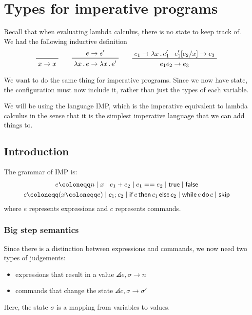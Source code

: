 \documentclass[class=scrartcl]{standalone}
\begin{document}
\chapter{Types for imperative programs}
Recall that when evaluating lambda calculus,
there is no state to keep track of.
We had the following inductive definition
\[
  \prfaxiom{x \to x} \qquad
  \prftree{e \to e'}
          {\plambda{x}{e} \to \plambda{x}{e'}} \qquad
  \prftree{e_1 \to \plambda{x}{e_1'}}
          {e_1'[e_2/x] \to e_3}
          {e_1 e_2 \to e_3}
\]

We want to do the same thing for imperative programs.
Since we now have state, the configuration must now include it,
rather than just the types of each variable.

We will be using the language IMP,
which is the imperative equivalent to lambda calculus
in the sense that it is the simplest imperative language
that we can add things to.

\section{Introduction}
The grammar of IMP is:
\begin{gather*}
  e \coloneqq n
         \mid x
         \mid e_1 + e_2
         \mid e_1 == e_2
         \mid \ptrue
         \mid \pfalse \\
  c \coloneqq (x \coloneqq e)
         \mid c_1; c_2
         \mid \pifthenelse{e}{c_1}{c_2}
         \mid \pwhiledo{e}{c}
         \mid \pskip
\end{gather*}
where \(e\) represents expressions and \(c\) represents commands.


\subsection{Big step semantics}
Since there is a distinction between expressions and commands,
we now need two types of judgements:
\begin{itemize}[nosep]
  \item expressions that result in a value \(\angles{e, \sigma} \to n\)
  \item commands that change the state \(\angles{c, \sigma} \to \sigma'\)
\end{itemize}
Here, the state \(\sigma\) is a mapping from variables to values.
\end{document}
